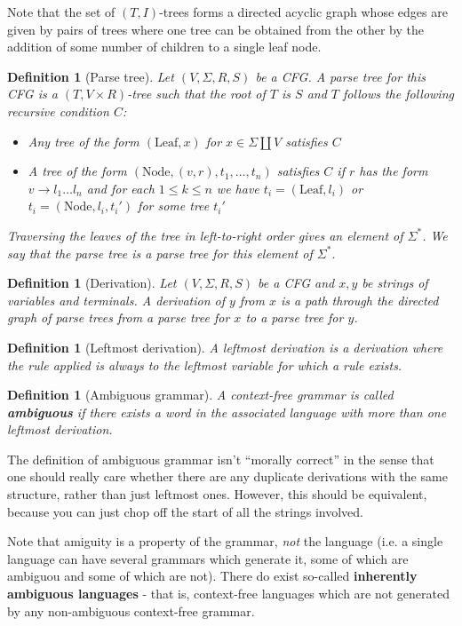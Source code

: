 \documentclass{article}
\theoremstyle{break}
\newtheorem{definition}[theorem]{Definition}
\begin{document}
Note that the set of $(T,I)$-trees forms a directed acyclic graph whose edges are given by pairs of trees where one tree can be obtained from the other by the addition of some number of children to a single leaf node.

\begin{definition}[Parse tree]
\label{def:parse-tree}
Let $(V, \Sigma, R, S)$ be a CFG. 
A parse tree for this CFG is a $(T, V\times R)$-tree such that the root of $T$ is $S$ and $T$ follows the following recursive condition $C$:
\begin{itemize}
  \item Any tree of the form $(\textrm{Leaf}, x)$ for $x \in \Sigma \coprod V$ satisfies $C$
  \item A tree of the form $(\textrm{Node}, (v,r), t_1, \ldots, t_n)$ satisfies $C$ if $r$ has the form $v \to l_1\ldots l_n$ and for each $1\leq k \leq n$ we have $t_i = (\textrm{Leaf}, l_i)$ or $t_i = (\textrm{Node}, l_i, t_i')$ for some tree $t_i'$
\end{itemize}

Traversing the leaves of the tree in left-to-right order gives an element of $\Sigma^*$. 
We say that the parse tree is a parse tree for this element of $\Sigma^*$.
\end{definition}

\begin{definition}[Derivation]
Let $(V, \Sigma, R, S)$ be a CFG and $x, y$ be strings of variables and terminals. 
A derivation of $y$ from $x$ is a path through the directed graph of parse trees from a parse tree for $x$ to a parse tree for $y$.
\end{definition}

\begin{definition}[Leftmost derivation]
\label{def:leftmost-derivation}
A leftmost derivation is a derivation where the rule applied is always to the leftmost variable for which a rule exists.
\end{definition}


\begin{definition}[Ambiguous grammar]
\label{def:ambiguous-grammar}
A context-free grammar is called \textbf{ambiguous} if there exists a word in the associated language with more than one leftmost derivation.
\end{definition}
The definition of ambiguous grammar isn't ``morally correct'' in the sense that one should really care whether there are any duplicate derivations with the same structure, rather than just leftmost ones.
However, this should be equivalent, because you can just chop off the start of all the strings involved.

Note that amiguity is a property of the grammar, \textit{not} the language (i.e. a single language can have several grammars which generate it, some of which are ambiguou and some of which are not).
There do exist so-called \textbf{inherently ambiguous languages} - that is, context-free languages which are not generated by any non-ambiguous context-free grammar.
\end{document}

